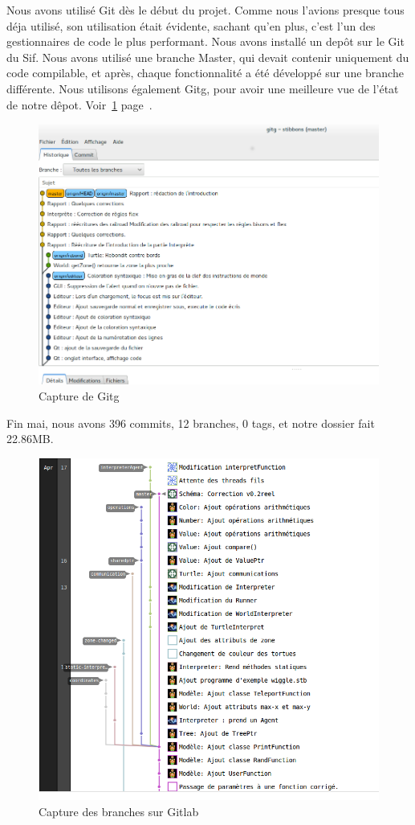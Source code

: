 Nous avons utilisé Git dès le début du projet. Comme nous l'avions presque tous déja utilisé, son utilisation était évidente, sachant qu'en plus, c'est l'un des gestionnaires de code le plus performant.
Nous avons installé un depôt sur le Git du Sif. Nous avons utilisé une branche Master, qui devait contenir uniquement du code compilable, et après, chaque fonctionnalité a été développé sur une branche différente.
Nous utilisons également Gitg, pour avoir une meilleure vue de l'état de notre dêpot. Voir~\ref{Gitg} page~\pageref{Gitg}.
\begin{figure}[h]
\caption{\label{Gitg} Capture de Gitg}
\includegraphics[scale=0.35]{doc/gestionProjet/gitbranche.png}
\end{figure}
Fin mai, nous avons 396 commits, 12 branches, 0 tags, et notre dossier fait 22.86MB.\\
\begin{figure}[h]
\caption{\label{branche} Capture des branches sur Gitlab}
\includegraphics[scale=0.35]{doc/report/uml/network-v3.png}
\end{figure}
